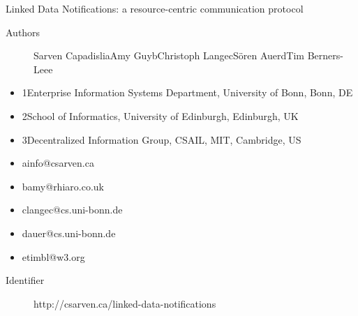 \documentclass[a4paper]{llncs}
\begin{document}
  
        
            
                Linked Data Notifications: a resource-centric communication protocol

                
                    \begin{description}
  \item[Authors] \empty Sarven Capadisli\empty a\empty Amy Guy\empty b\empty Christoph Lange\empty c\empty Sören Auer\empty d\empty Tim Berners-Lee\empty e
    \end{description}
  

                    \begin{itemize}
  \item 1Enterprise Information Systems Department, \empty University of Bonn, Bonn, DE\item 2School of Informatics, \empty University of Edinburgh, Edinburgh, UK\item 3Decentralized Information Group, CSAIL, \empty MIT, Cambridge, US
    \end{itemize}
  

                    \begin{itemize}
  \item a\empty info@csarven.ca\item b\empty amy@rhiaro.co.uk\item c\empty langec@cs.uni-bonn.de\item d\empty auer@cs.uni-bonn.de\item e\empty timbl@w3.org
    \end{itemize}
  
                

                \begin{description}
  \item[Identifier] \empty http://csarven.ca/linked-data-notifications
    \end{description}
  

                
                    
                        
                        
\end{document}
